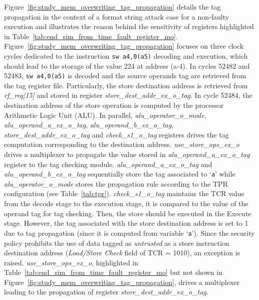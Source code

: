 Figure~\ref{fig:study_mem_overwriting_tag_propagation} details the tag propagation in the context of a format string attack case for a non-faulty execution and illustrates the reason behind the sensitivity of registers highlighted in Table~\ref{tab:end_sim_from_time_fault_register_mo}.
Figure~\ref{fig:study_mem_overwriting_tag_propagation} focuses on three clock cycles dedicated to the instruction \verb|sw a4,0(a5)| decoding and execution, which should lead to the storage of the value 224 at address (a-4). 
In cycles 52482 and 52483, \verb|sw a4,0(a5)| is decoded and the source operands tag are retrieved from the tag register file. Particularly, the store destination address is retrieved from \textit{rf\_reg[15]} and stored in register \textit{store\_dest\_addr\_ex\_o\_tag}. In cycle 52484, the destination address of the store operation is computed by the processor Arithmetic Logic Unit (ALU).
In parallel, \textit{alu\_operator\_o\_mode}, \textit{alu\_operand\_a\_ex\_o\_tag}, \textit{alu\_operand\_b\_ex\_o\_tag}, \textit{store\_dest\_addr\_ex\_o\_tag} and \textit{check\_s1\_o\_tag} registers drives the tag computation corresponding to the destination address. 
\textit{use\_store\_ops\_ex\_o} drives a multiplexer to propagate the value stored in \textit{alu\_operand\_a\_ex\_o\_tag} register to the tag checking module. 
\textit{alu\_operand\_a\_ex\_o\_tag} and \textit{alu\_operand\_b\_ex\_o\_tag} sequentially store the tag associated to `\verb|a|' while \textit{alu\_operator\_o\_mode} stores the propagation rule according to the TPR configuration (see Table~\ref{tab:tpr}).
\textit{check\_s1\_o\_tag} maintains the TCR value from the decode stage to the execution stage, it is compared to the value of the operand tag for tag checking.
Then, the store should be executed in the Execute stage. However, the tag associated with the store destination address is set to 1 due to tag propagation (since it is computed from variable `\verb|a|'). 
Since the security policy prohibits the use of data tagged as \textit{untrusted} as a store instruction destination address (\textit{Load/Store Check} field of TCR = 1010), an exception is raised.
\textit{use\_store\_ops\_ex\_o}, highlighted in Table~\ref{tab:end_sim_from_time_fault_register_mo} but not shown in Figure~\ref{fig:study_mem_overwriting_tag_propagation}, drives a multiplexer leading to the propagation of register \textit{store\_dest\_addr\_ex\_o\_tag}.

